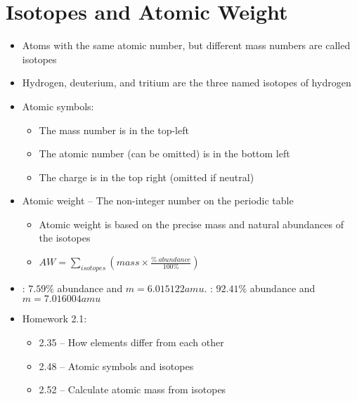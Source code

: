 \documentclass[12pt, openany, letterpaper]{memoir}
\begin{document}
\section{Isotopes and Atomic Weight}
\begin{itemize}
	\item Atoms with the same atomic number, but different mass numbers are called isotopes
	\item Hydrogen, deuterium, and tritium are the three named isotopes of hydrogen
	\item Atomic symbols: 
	\begin{itemize}
		\item The mass number is in the top-left
		\item The atomic number (can be omitted) is in the bottom left
		\item The charge is in the top right (omitted if neutral)
	\end{itemize}
	\item Atomic weight -- The non-integer number on the periodic table
	\begin{itemize}
		\item Atomic weight is based on the precise mass and natural abundances of the isotopes
		\item $AW=\sum\limits_{isotopes}\left(mass\times \frac{\%~abundance}{100\%}\right)$
	\end{itemize}
	\item {}: $7.59\%$ abundance and $m=6.015122amu$. : $92.41\%$ abundance and $m=7.016004amu$
	\item Homework 2.1:
	\begin{itemize}
		\item 2.35 -- How elements differ from each other
		\item 2.48 -- Atomic symbols and isotopes
		\item 2.52 -- Calculate atomic mass from isotopes
	\end{itemize}
\end{itemize}
\end{document}
